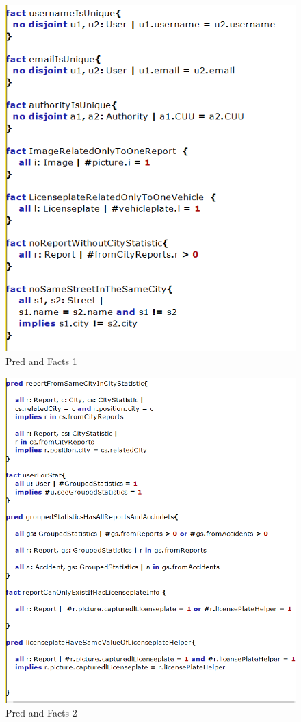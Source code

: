 \begin{figure}[h]
	\centering
	\includegraphics[width=0.9\linewidth, height=0.8\textheight]{Images/Alloy/codealloy4}
	\caption{Pred and Facts 1}
	\label{Pred and Facts 1}
\end{figure}

\begin{figure}[h]
	\centering
	\includegraphics[width=0.9\linewidth, height=0.8\textheight]{Images/Alloy/codealloy5}
	\caption{Pred and Facts 2}
	\label{Pred and Facts 2}
\end{figure}

